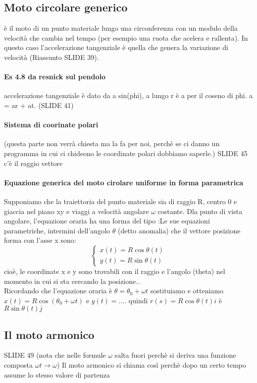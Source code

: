 \documentclass[12pt, a4paper, openany]{book}
\begin{document}
\subsection*{Moto circolare generico} è il moto di un punto materiale lungo una circonferenza con un modulo della velocità che cambia nel tempo (per esempio una ruota che acelera e rallenta).
In questo caso l'accelerazione tangenziale è quella che genera la variazione di velocità (Riassunto SLIDE 39).

\paragraph*{Es 4.8 da resnick sul pendolo}
accelerazione tangenziale è dato da a sin(phi), a lungo r è a per il coseno di phi. a = ar + at. (SLIDE 41)

\paragraph*{Sistema di coorinate polari} (questa parte non verrà chiesta ma la fa per noi, perchè se ci danno un programma in cui ci chideono le coordinate polari dobbiamo saperle.)
SLIDE 45 c'è il raggio vettore

\paragraph*{Equazione generica del moto cirolare uniforme in forma parametrica} Supponiamo che la traiettoria del punto materiale sia di raggio R, centro 0 e giaccia nel piano xy e viaggi a velocità angolare $\omega$ costante.
Dla punto di vista angolare, l'equazione oraria ha una forma del tipo :Le sue equazioni parametriche, intermini dell'angolo $\theta$ (detto anomalia) che il vettore posizione forma con l'asse x sono:
$$\begin{cases}
        x(t) = R \cos \theta(t) \\
        y(t) = R \sin \theta (t)
    \end{cases}
$$
cioè, le coordinate x e y sono trovabili con il raggio e l'angolo (theta) nel momento in cui si sta cercando la posizione..
\\Ricordando che l'equazione oraria è $\theta = \theta_0 + \omega t$ sostituiamo e otteniamo $x(t) = R \cos (\theta_0 + \omega t)$ e $y(t)=...$.
quindi $r(s) = R\cos\theta(t) i$ è $R\sin\theta(t) j$

\subsection*{Il moto armonico}
SLIDE 49 (nota che nelle formule $\omega$ salta fuori perchè si deriva una funzione composta $\omega t \to \omega$)
Il moto armonico si chiama così perchè dopo un certo tempo assume lo stesso valore di partenza
\end{document}
